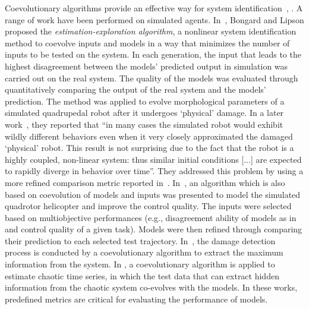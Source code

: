 Coevolutionary algorithms provide an effective way for system identification~\cite{Bongard2005}, \cite{Bongard_remote_robot_2004,Bongard_function_recovery_2004,Koos2009,Bongard2007PNAS,Mirm2011,Ly2014}. A range of work have been performed on simulated agents. In~\cite{Bongard_remote_robot_2004}, Bongard and Lipson proposed the \emph{estimation-exploration algorithm}, a nonlinear system identification method to coevolve inputs and models in a way that minimizes the number of inputs to be tested on the system. In each generation, the input that leads to the highest disagreement between the models' predicted output in simulation was carried out on the real system. The quality of the models was evaluated through quantitatively comparing the output of the real system and the models' prediction. The method was applied to evolve morphological parameters of a simulated quadrupedal robot after it undergoes `physical' damage. In a later work~\cite{Bongard_function_recovery_2004}, they reported that ``in many cases the simulated robot would exhibit wildly different behaviors even when it very closely approximated the damaged `physical' robot. This result is not surprising due to the fact that the robot is a highly coupled, non-linear system: thus similar initial conditions [...] are expected to rapidly diverge in behavior over time''. They addressed this problem by using a more refined comparison metric reported in~\cite{Bongard_function_recovery_2004}. In~\cite{Koos2009}, an algorithm which is also based on coevolution of models and inputs was presented to model the simulated quadrotor helicopter and improve the control quality. The inputs were selected based on multiobjective performances (e.g., disagreement ability of models as in ~\cite{Bongard_remote_robot_2004} and control quality of a given task). Models were then refined through comparing their prediction to each selected test trajectory. In~\cite{Kouchmeshky_2007}, the damage detection process is conducted by a coevolutionary algorithm to extract the maximum information from the system. In \cite{Mirmomeni_2011}, a coevolutionary algorithm is applied to estimate chaotic time series, in which the test data that can extract hidden information from the chaotic system co-evolves with the models. In these works, predefined metrics are critical for evaluating the performance of models. 
  
